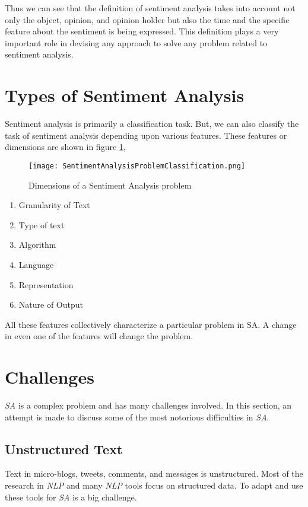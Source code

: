 \par
Thus we can see that the definition of sentiment analysis takes into account not only the object, opinion, and opinion holder but 
also the time and the specific feature about the sentiment is being expressed. This definition plays a very important role
in devising any approach to solve any problem related to sentiment analysis. 

\section{Types of Sentiment Analysis}

\par 
Sentiment analysis is primarily a classification task. But, we can also classify the task of sentiment analysis depending
upon various features. These features or dimensions are shown in figure \ref{fig:dimensions},

\begin{figure}[ht]
\caption{Dimensions of a Sentiment Analysis problem}
\label{fig:dimensions}
\texttt{[image: SentimentAnalysisProblemClassification.png]}
\end{figure}

\clearpage

\begin{enumerate}
 \item Granularity of Text
 \item Type of text
 \item Algorithm
 \item Language
 \item Representation
 \item Nature of Output
\end{enumerate}

All these features collectively characterize a particular problem in SA. A change in even one of the features will change the
problem.

\section{Challenges}
\textit{SA} is a complex problem and has many challenges involved. In this section, an attempt is made to discuss some of the most notorious
difficulties in \textit{SA}. 

\subsection{Unstructured Text}
Text in micro-blogs, tweets, comments, and messages is unstructured. Most of the research in \textit{NLP} and many \textit{NLP} tools focus on structured
data. To adapt and use these tools for \textit{SA} is a big challenge. 

